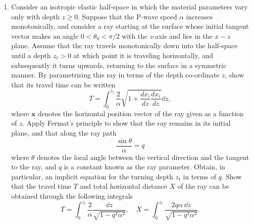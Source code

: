 \documentclass[a4paper,10pt]{paper}
\begin{document}
\begin{enumerate}
\item Consider an isotropic elastic half-space in which the material parameters vary only with depth $z\ge0$. Suppose that the P-wave speed $\alpha$ increases monotonically, and consider a ray starting at the surface whose initial tangent vector makes an angle $0<\theta_{0}<\pi/2$ with the $z$-axis and lies in the $x-z$ plane. Assume that the ray travels monotonically down into the half-space until a depth $z_{t}>0$ at which point it is traveling horizontally, and subsequently it turns upwards, returning to the surface in a symmetric manner. By parametrising this ray in terms of the depth co-ordinate $z$, show that its travel time can be written
\begin{equation*}
    T=\int_{0}^{z_{t}}\frac{2}{\alpha}\sqrt{1+\frac{d x_{i}}{dz}\frac{d x_{i}}{dz}}\dd z,
\end{equation*}
where $\mathbf{x}$ denotes the horizontal position vector of the ray given as a function of $z$. Apply Fermat's principle to show that the ray remains in its initial plane, and that along the ray path
\begin{equation*}
    \frac{\sin\theta}{\alpha}=q
\end{equation*}
where $\theta$ denotes the local angle between the vertical direction and the tangent to the ray, and $q$ is a constant known as the ray parameter. Obtain, in particular, an implicit equation for the turning depth $z_{t}$ in terms of $q$.
Show that the travel time $T$ and total horizontal distance $X$ of the ray can be obtained through the following integrals
\begin{equation*}
    T=\int_{0}^{z_{t}}\frac{2}{\alpha}\frac{\dd z}{\sqrt{1-q^{2}\alpha^{2}}},\quad X=\int_{0}^{z_{t}}\frac{2q\alpha~\dd z}{\sqrt{1-q^{2}\alpha^{2}}}.
\end{equation*}
\end{enumerate}
\end{document}

